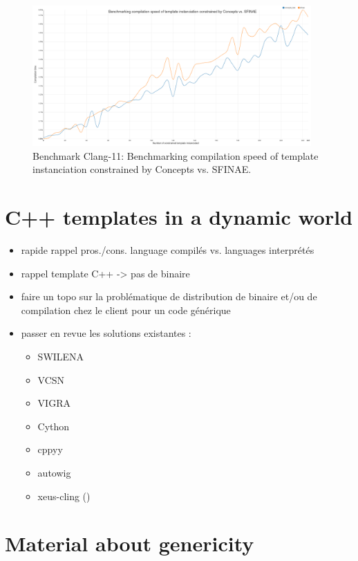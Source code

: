 \begin{figure}[htb]
  \centering
  \includegraphics[width=4.2in]{figs/compile_time_benches/clang11/chart.concept2.png}
  \caption{Benchmark Clang-11: Benchmarking compilation speed of template instanciation constrained by Concepts vs. SFINAE.}
  \label{fig.gen.bench.clang11.2.concept.sfinae}
\end{figure}


\section{C++ templates in a dynamic world}

\begin{itemize}
  \item rapide rappel pros./cons. language compilés vs. languages interprétés
  \item rappel template C++ -> pas de binaire
  \item faire un topo sur la problématique de distribution de binaire et/ou de compilation chez le client pour un code générique
  \item passer en revue les solutions existantes :
        \begin{itemize}
          \item SWILENA
          \item VCSN
          \item VIGRA
          \item Cython
          \item cppyy
          \item autowig
          \item xeus-cling ()
        \end{itemize}
\end{itemize}


\clearpage






\section*{Material about genericity}


